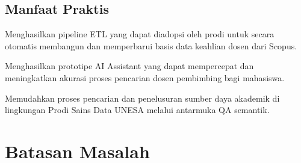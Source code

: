 \subsection{Manfaat Praktis}
\begin{subsectlist}
	\begin{packed_item_sub}
		\item Menghasilkan pipeline ETL yang dapat diadopsi oleh prodi untuk secara otomatis membangun dan memperbarui basis data keahlian dosen dari Scopus.
		\item Menghasilkan prototipe AI Assistant yang dapat mempercepat dan meningkatkan akurasi proses pencarian dosen pembimbing bagi mahasiswa.
		\item Memudahkan proses pencarian dan penelusuran sumber daya akademik di lingkungan Prodi Sains Data UNESA melalui antarmuka QA semantik.
	\end{packed_item_sub}
\end{subsectlist}
	
\section{Batasan Masalah}

